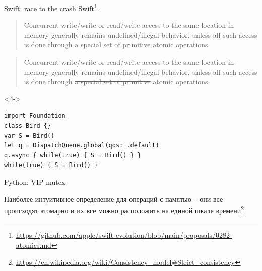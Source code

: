 \begin{frame}[fragile, t]{Swift: race to the crash}
Swift\footnote{\tiny\url{https://github.com/apple/swift-evolution/blob/main/proposals/0282-atomics.md}}

 {
\begin{quote}
Concurrent write/write or read/write access to the same location in memory generally remains undefined/illegal behavior, unless all such access is done through a special set of primitive atomic operations.
\end{quote}
}

 {
\begin{quote}
Concurrent write/write \sout{or read/write} access to the same location \sout{in memory generally} remains \sout{undefined/}illegal behavior, unless \sout{all such access} is done through \sout{a special set of primitive} atomic operations.
\end{quote}	
}


\begin{onlyenv}<4->
\begin{verbatim}
import Foundation
class Bird {}
var S = Bird()
let q = DispatchQueue.global(qos: .default)
q.async { while(true) { S = Bird() } }
while(true) { S = Bird() }
\end{verbatim}
\end{onlyenv}



\end{frame}


\begin{frame}[fragile, t]{Python: VIP mutex}

Наиболее интуитивное определение для операций с памятью -- они все происходят атомарно и их все можно расположить на единой шкале времени\footnote{\tiny\url{https://en.wikipedia.org/wiki/Consistency_model#Strict_consistency}}.

\end{frame}


